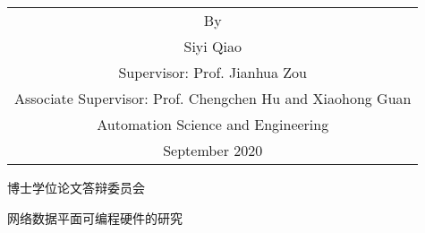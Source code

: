 \begin{titlepage}
\begin{center}
		\vspace{3cm}
		{\sanhao
			\begin{center} \renewcommand{\arraystretch}{1.5}
				\begin{tabular}{c}
					By \\
					Siyi Qiao \\
					Supervisor: Prof. Jianhua Zou \\
					Associate Supervisor: Prof. Chengchen Hu and Xiaohong Guan \\%
					Automation Science and Engineering \\
					September 2020 \\ %
				\end{tabular} \renewcommand{\arraystretch}{1}
			\end{center} 
		}
	\end{center}
	\clearpage{\pagestyle{empty}\cleardoublepage}
	
	\newpage\thispagestyle{empty}
	\begin{center}
		\parbox[t][0.7cm][t]{\textwidth}{}
		
		\begin{center}{\boldsong 博士学位论文答辩委员会}\end{center}
		
		\vspace{1cm}
		\begin{center}{\boldsong 网络数据平面可编程硬件的研究}\end{center}
		

\end{center}
\end{titlepage}
